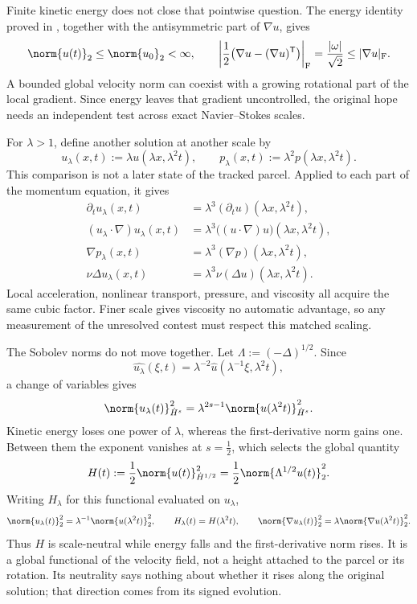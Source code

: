 Finite kinetic energy does not close that pointwise question. The energy identity proved in , together with the antisymmetric part of \(\nabla u\), gives
\[
  \norm{u(t)}_2
  \leq
  \norm{u_0}_2
  <\infty,
  \qquad
  \left|\frac12\bigl(\nabla u-(\nabla u)^{\mathsf T}\bigr)\right|_{\mathrm F}
  =
  \frac{|\omega|}{\sqrt2}
  \leq
  |\nabla u|_{\mathrm F}.
\]
A bounded global velocity norm can coexist with a growing rotational part of the local gradient. Since energy leaves that gradient uncontrolled, the original hope needs an independent test across exact Navier--Stokes scales.


For \(\lambda>1\), define another solution at another scale by
\[
  u_\lambda(x,t)
  :=
  \lambda u(\lambda x,\lambda^2t),
  \qquad
  p_\lambda(x,t)
  :=
  \lambda^2p(\lambda x,\lambda^2t).
\]
This comparison is not a later state of the tracked parcel. Applied to each part of the momentum equation, it gives
\[
\begin{aligned}
  \partial_tu_\lambda(x,t)
  &=
  \lambda^3(\partial_tu)(\lambda x,\lambda^2t),
  \\
  (u_\lambda\cdot\nabla)u_\lambda(x,t)
  &=
  \lambda^3\bigl((u\cdot\nabla)u\bigr)(\lambda x,\lambda^2t),
  \\
  \nabla p_\lambda(x,t)
  &=
  \lambda^3(\nabla p)(\lambda x,\lambda^2t),
  \\
  \nu\Delta u_\lambda(x,t)
  &=
  \lambda^3\nu(\Delta u)(\lambda x,\lambda^2t).
\end{aligned}
\]
Local acceleration, nonlinear transport, pressure, and viscosity all acquire the same cubic factor. Finer scale gives viscosity no automatic advantage, so any measurement of the unresolved contest must respect this matched scaling.


The Sobolev norms do not move together. Let \(\Lambda:=(-\Delta)^{1/2}\). Since
\[
  \widehat{u_\lambda}(\xi,t)
  =
  \lambda^{-2}\widehat u(\lambda^{-1}\xi,\lambda^2t),
\]
a change of variables gives
\[
  \norm{u_\lambda(t)}_{\dot H^s}^2
  =
  \lambda^{2s-1}
  \norm{u(\lambda^2t)}_{\dot H^s}^2.
\]
Kinetic energy loses one power of \(\lambda\), whereas the first-derivative norm gains one. Between them the exponent vanishes at \(s=\tfrac12\), which selects the global quantity
\[
  H(t)
  :=
  \frac12\norm{u(t)}_{\dot H^{1/2}}^2
  =
  \frac12\norm{\Lambda^{1/2}u(t)}_2^2.
\]
Writing \(H_\lambda\) for this functional evaluated on \(u_\lambda\),
\[
  \norm{u_\lambda(t)}_2^2
  =
  \lambda^{-1}\norm{u(\lambda^2t)}_2^2,
  \qquad
  H_\lambda(t)=H(\lambda^2t),
  \qquad
  \norm{\nabla u_\lambda(t)}_2^2
  =
  \lambda\norm{\nabla u(\lambda^2t)}_2^2.
\]
Thus \(H\) is scale-neutral while energy falls and the first-derivative norm rises. It is a global functional of the velocity field, not a height attached to the parcel or its rotation. Its neutrality says nothing about whether it rises along the original solution; that direction comes from its signed evolution.

